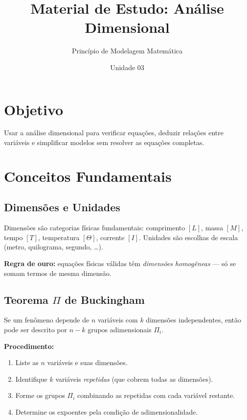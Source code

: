 \documentclass[12pt,a4paper]{article}
\title{Material de Estudo: An\'alise Dimensional}
\author{Princ\'ipio de Modelagem Matem\'atica}
\date{Unidade 03}
\begin{document}
\maketitle

\section*{Objetivo}
Usar a an\'alise dimensional para verificar equa\c{c}\~oes, deduzir rela\c{c}\~oes entre vari\'aveis e simplificar modelos sem resolver as equa\c{c}\~oes completas.

\section*{Conceitos Fundamentais}

\subsection*{Dimens\~oes e Unidades}
Dimens\~oes s\~ao categorias f\'isicas fundamentais: comprimento $[L]$, massa $[M]$, tempo $[T]$, temperatura $[\Theta]$, corrente $[I]$.
Unidades s\~ao escolhas de escala (metro, quilograma, segundo, \ldots).

\textbf{Regra de ouro:} equa\c{c}\~oes f\'isicas v\'alidas t\^em \emph{dimens\~oes homog\^eneas} --- s\'o se somam termos de mesma dimens\~ao.

\subsection*{Teorema $\Pi$ de Buckingham}
Se um fen\^omeno depende de $n$ vari\'aveis com $k$ dimens\~oes independentes, ent\~ao pode ser descrito por $n - k$ grupos adimensionais $\Pi_i$.

\textbf{Procedimento:}
\begin{enumerate}
  \item Liste as $n$ vari\'aveis e suas dimens\~oes.
  \item Identifique $k$ vari\'aveis \emph{repetidas} (que cobrem todas as dimens\~oes).
  \item Forme os grupos $\Pi_i$ combinando as repetidas com cada vari\'avel restante.
  \item Determine os expoentes pela condi\c{c}\~ao de adimensionalidade.
\end{enumerate}
\end{document}
